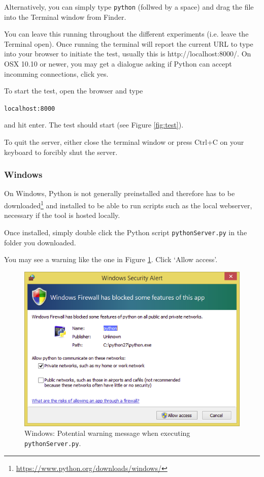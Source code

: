 \documentclass[11pt, oneside]{article}   	%
\begin{document}
	        Alternatively, you can simply type \texttt{python} (follwed by a space) and drag the file into the Terminal window from Finder. %
			
			You can leave this running throughout the different experiments (i.e. leave the Terminal open). Once running the terminal will report the current URL to type into your browser to initiate the test, usually this is http://localhost:8000/.
			On OSX 10.10 or newer, you may get a dialogue asking if Python can accept incomming connections, click yes.

			To start the test, open the browser and type 
				
			\texttt{localhost:8000}

			and hit enter. The test should start (see Figure \ref{fig:test}). 

			To quit the server, either close the terminal window or press Ctrl+C on your keyboard to forcibly shut the server.

		\subsubsection{Windows}

			On Windows, Python is not generally preinstalled and therefore has to be downloaded\footnote{\url{https://www.python.org/downloads/windows/}} and installed to be able to run scripts such as the local webserver, necessary if the tool is hosted locally. 
		
			Once installed, simply double click the Python script \texttt{pythonServer.py} in the folder you downloaded.
			
			You may see a warning like the one in Figure \ref{fig:warning}. Click `Allow access'. 
			
			\begin{figure}[htbp]
            \begin{center}
            \includegraphics[width=.6\textwidth]{warning.png}
            \caption{Windows: Potential warning message when executing \texttt{pythonServer.py}.}
            \label{fig:warning}
            \end{center}
            \end{figure}
            
\end{document}
